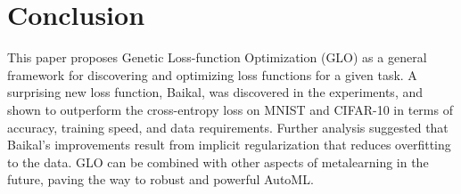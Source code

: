 \documentclass[conference]{IEEEtran}
\newcommand{\TECH}{GLO\xspace}
\begin{document}
\section{Conclusion}

This paper proposes Genetic Loss-function Optimization (\TECH) as a
general framework for discovering and optimizing loss functions for a
given task. A surprising new loss function, Baikal, was discovered in the
experiments, and shown to outperform the cross-entropy loss on MNIST
and CIFAR-10 in terms of accuracy, training speed, and data
requirements. Further analysis suggested that Baikal's improvements result from implicit regularization that reduces overfitting to the data. \TECH can be combined with
other aspects of metalearning in the future, paving the way to robust and
powerful AutoML.




\end{document}
